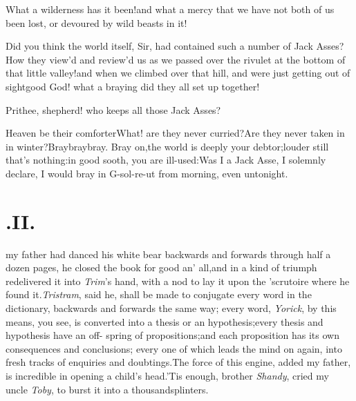 \documentclass{article}
\begin{document}
\tsh What a wilderness has it been!\break and what a
mercy that we have not both of us been
lost, or devoured by wild beasts in it!

Did you think the world itself, Sir, had contained such a number
of Jack Asses?\tsh How they view’d and
review’d us as we passed over the rivulet at the bottom of
that little valley!\tsh\break and when we climbed over that
hill, and were just getting out of sight\tsk good God! what a
braying did they all set up together!

\tsh Prithee, shepherd! who keeps all those
Jack Asses? \quad\ast\quad\ast\quad\ast

\tsh Heaven be their comforter\tsh\break What! are
they never curried?\tsh Are they never taken in in
winter?\tsh Bray\break bray\tsk bray. Bray on,\tsk the world
is deeply your debtor;\tsh louder still\tsk{} that’s
nothing:\tsk in good sooth, you\break
are ill-used:\tsh Was I a Jack Asse, I\break
solemnly declare, I would bray in\break
G-sol-re-ut from morning, even unto\break night.

\section{.\enspace II.}

 my father had danced his white bear backwards and forwards through
half a dozen pages, he closed the book for good an’ all,\tsk and in a kind of
triumph redelivered it into \textit{Trim}’s hand, with a nod to lay it upon the
’scrutoire where he found it.\tsh \textit{Tristram}, said he, shall be made to
conjugate every word in the dictionary, backwards and forwards the same way;\tsh
every word, \textit{Yorick}, by this means, you see, is converted into a thesis or
an hypothesis;\tsk every thesis and hypothesis have an off- spring of
propositions;\tsk and each pro\-position has its own consequences and conclusions;
every one of which leads the mind on again, into fresh tracks of enquiries and
doubtings.\tsh The force of this engine, added my father, is incredible in opening a
child’s head.\tsh ’Tis enough, brother \textit{Shandy}, cried my uncle
\textit{Toby}, to burst it into a thousand\break splinters.\tsh
\end{document}
